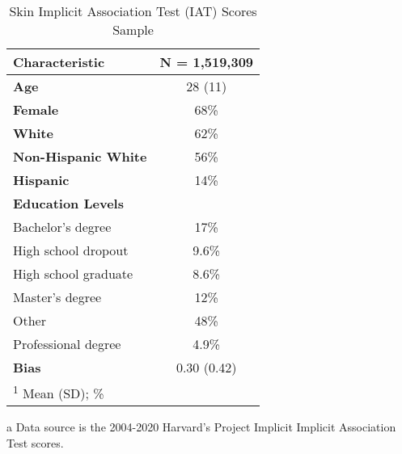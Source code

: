 \begin{table}[H]

\caption{Skin Implicit Association Test (IAT) Scores Sample \label{tab:sumstat-iat}}
\centering
\begin{threeparttable}
\begin{tabular}[t]{>{}lc}
\toprule
Characteristic & N = 1,519,309\\
\midrule
\textbf{Age} & 28 (11)\\
\textbf{Female} & 68\%\\
\textbf{White} & 62\%\\
\textbf{Non-Hispanic White} & 56\%\\
\textbf{Hispanic} & 14\%\\
\textbf{Education Levels} & \\
\hspace{1em}Bachelor's degree & 17\%\\
\hspace{1em}High school dropout & 9.6\%\\
\hspace{1em}High school graduate & 8.6\%\\
\hspace{1em}Master's degree & 12\%\\
\hspace{1em}Other & 48\%\\
\hspace{1em}Professional degree & 4.9\%\\
\textbf{Bias} & 0.30 (0.42)\\
\bottomrule
\multicolumn{2}{l}{\rule{0pt}{1em}\textsuperscript{1} Mean (SD); \%}\\
\end{tabular}
\begin{tablenotes}
\item[a] Data source is the 2004-2020 Harvard's Project Implicit Implicit Association Test scores.
\end{tablenotes}
\end{threeparttable}
\end{table}
